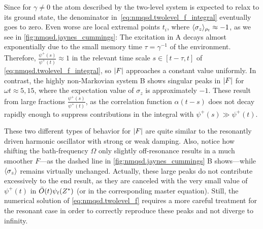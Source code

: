 Since for $\gamma \neq 0$ the atom described by the two-level system is expected to relax to its ground state, the denominator in~\ref{eq:nmqsd.twolevel_f_integral} eventually goes to zero.
Even worse are local extremal points $t_i$, where $\langle \sigma_z \rangle_{\rho_t} \approx -1$, as we see in \autoref{fig:nmqsd.jaynes_cummings}:
The excitation in A decays almost exponentially due to the small memory time $\tau = \gamma^{-1}$ of the environment.
Therefore, $\frac{\psi^+(s)}{\psi^+(t)} \approx 1$ in the relevant time scale $s \in [t - \tau, t]$ of \autoref{eq:nmqsd.twolevel_f_integral}, so $\vert F \vert$ approaches a constant value uniformly.
In contrast, the highly non-Markovian system B shows singular peaks in $\vert F \vert$ for $\omega t \approx 5, 15$, where the expectation value of $\sigma_z$ is approximately $-1$.
These result from large fractions $\frac{\psi^+(s)}{\psi^+(t)}$, as the correlation function $\alpha(t-s)$ does not decay rapidly enough to suppress contributions in the integral with $\psi^+(s) \gg \psi^+(t)$.


These two different types of behavior for $\vert F \vert$ are quite similar to the resonantly driven harmonic oscillator with strong or weak damping.
Also, notice how shifting the bath-frequency $\Omega$ only slightly off-resonance results in a much smoother $F$---as the dashed line in \autoref{fig:nmqsd.jaynes_cummings} B shows---while $\langle \sigma_z \rangle$ remains virtually unchanged.
Actually, these large peaks do not contribute excessively to the end result, as they are canceled with the very small value of $\psi^+(t)$ in $\bar O(t) \psitZ$ (or in the corresponding master equation).
Still, the numerical solution of \autoref{eq:nmqsd.twolevel_f} requires a more careful treatment for the resonant case in order to correctly reproduce these peaks and not diverge to infinity.\\



